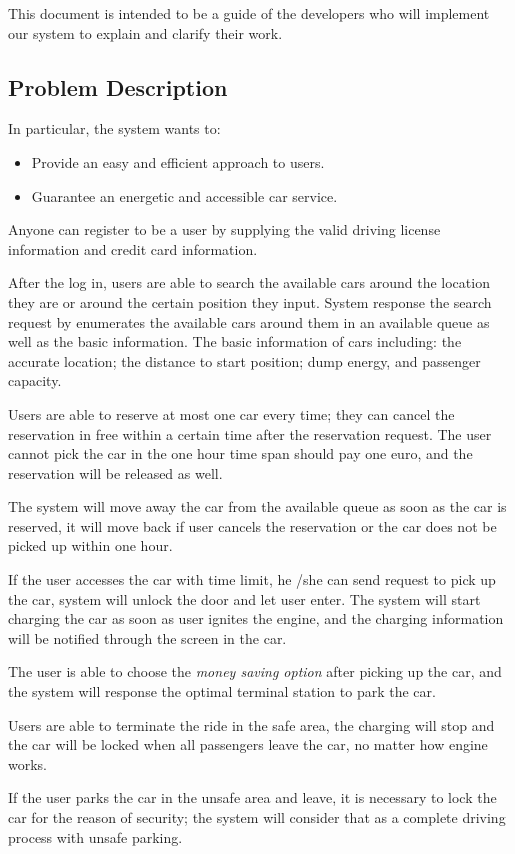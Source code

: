 \documentclass[a4paper,11pt]{article}
\begin{document}
This document is intended to be a guide of the developers who will implement our system to explain and clarify their work. 
	 
	\subsection{Problem Description}	
	In particular, the system wants to: 
	\begin{itemize}
		\item Provide an easy and efficient approach to users.
		\item Guarantee an energetic and accessible car service. 
	\end{itemize}
	Anyone can register to be a user by supplying the valid driving license information and credit card information.
	
After the log in, users are able to search the available cars around the location they are or around the certain position they input. System response the search request by enumerates the available cars around them in an available queue as well as the basic information. The basic information of cars including: the accurate location; the distance to start position; dump energy, and passenger capacity. 

Users are able to reserve at most one car every time; they can cancel the reservation in free within a certain time after the reservation request. The user cannot pick the car in the one hour time span should pay one euro, and the reservation will be released as well.

The system will move away the car from the available queue as soon as the car is reserved, it will move back if user cancels the reservation or the car does not be picked up within one hour.

If the user accesses the car with time limit, he /she can send request to pick up the car, system will unlock the door and let user enter. The system will start charging the car as soon as user ignites the engine, and the charging information will be notified through the screen in the car.

The user is able to choose the \textsl{money saving option} after picking up the car, and the system will response the optimal terminal station to park the car.

Users are able to terminate the ride in the safe area, the charging will stop and the car will be locked when all passengers leave the car, no matter how engine works.

If the user parks the car in the unsafe area and leave, it is necessary to lock the car for the reason of security; the system will consider that as a complete driving process with unsafe parking.
\end{document}
